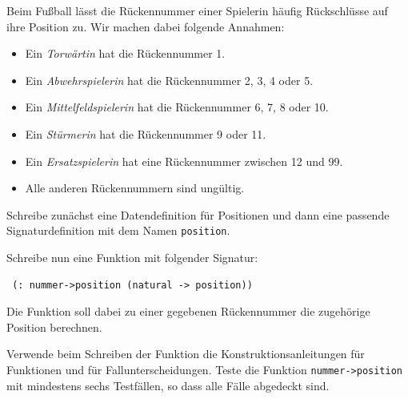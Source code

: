 \begin{aufgabe}
  Beim Fußball lässt die Rückennummer einer Spielerin
  häufig Rückschlüsse auf ihre Position zu. Wir machen dabei folgende
  Annahmen:
  \begin{itemize}
  \item Ein \emph{Torwärtin} hat die Rückennummer 1.
  \item Ein \emph{Abwehrspielerin} hat die Rückennummer 2, 3, 4 oder 5.
  \item Ein \emph{Mittelfeldspielerin} hat die Rückennummer 6, 7, 8 oder 10.
  \item Ein \emph{Stürmerin} hat die Rückennummer 9 oder 11.
  \item Ein \emph{Ersatzspielerin} hat eine Rückennummer zwischen 12 und 99.
  \item Alle anderen Rückennummern sind ungültig.
  \end{itemize}
  Schreibe zunächst eine Datendefinition für Positionen und dann eine
  passende Signaturdefinition mit dem Namen \texttt{position}.
  
  Schreibe nun eine Funktion mit folgender Signatur:
\begin{verbatim}
 (: nummer->position (natural -> position))
\end{verbatim}
  Die Funktion soll dabei zu einer gegebenen Rückennummer die
  zugehörige Position berechnen.

  Verwende beim Schreiben der Funktion die
  Konstruktionsanleitungen für Funktionen und für
  Fallunterscheidungen.  Teste die Funktion
  \texttt{nummer->position} mit mindestens sechs Testfällen, so dass
  alle Fälle abgedeckt sind.
\end{aufgabe}


